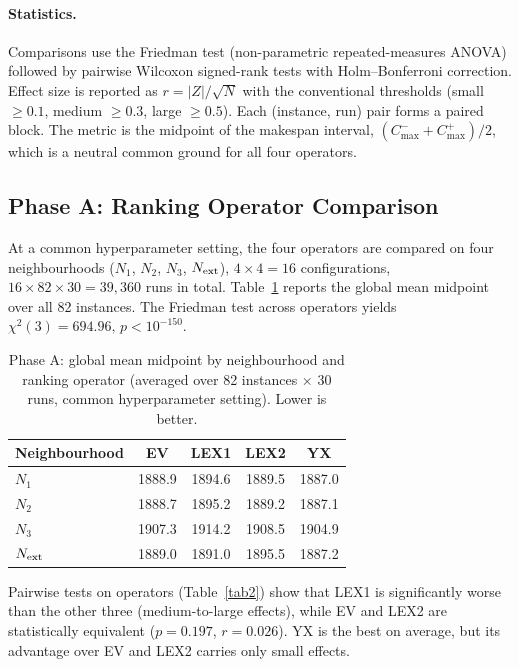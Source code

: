 \documentclass[preprint,12pt]{elsarticle}
\begin{document}
\paragraph{Statistics.} Comparisons use the Friedman test (non-parametric repeated-measures ANOVA) followed by pairwise Wilcoxon signed-rank tests with Holm--Bonferroni correction. Effect size is reported as $r = |Z| / \sqrt{N}$ with the conventional thresholds (small $\geq 0.1$, medium $\geq 0.3$, large $\geq 0.5$). Each (instance, run) pair forms a paired block. The metric is the midpoint of the makespan interval, $(C^-_{\max} + C^+_{\max})/2$, which is a neutral common ground for all four operators.

\subsection{Phase A: Ranking Operator Comparison}
\label{sec6.2}

At a common hyperparameter setting, the four operators are compared on four neighbourhoods ($N_1$, $N_2$, $N_3$, $N_{\rm ext}$), $4 \times 4 = 16$ configurations, $16 \times 82 \times 30 = 39{,}360$ runs in total. Table~\ref{tab1} reports the global mean midpoint over all 82 instances. The Friedman test across operators yields $\chi^{2}(3) = 694.96,\, p < 10^{-150}$.

\begin{table}[t]
\centering
\caption{Phase A: global mean midpoint by neighbourhood and ranking operator (averaged over 82 instances $\times$ 30 runs, common hyperparameter setting). Lower is better.}
\label{tab1}
\begin{tabular}{l c c c c}
\hline
Neighbourhood & EV & LEX1 & LEX2 & YX \\
\hline
$N_1$         & 1888.9 & 1894.6 & 1889.5 & 1887.0 \\
$N_2$         & 1888.7 & 1895.2 & 1889.2 & 1887.1 \\
$N_3$         & 1907.3 & 1914.2 & 1908.5 & 1904.9 \\
$N_{\rm ext}$ & 1889.0 & 1891.0 & 1895.5 & 1887.2 \\
\hline
\end{tabular}
\end{table}

Pairwise tests on operators (Table~\ref{tab2}) show that LEX1 is significantly worse than the other three (medium-to-large effects), while EV and LEX2 are statistically equivalent ($p = 0.197$, $r = 0.026$). YX is the best on average, but its advantage over EV and LEX2 carries only small effects.
\end{document}
